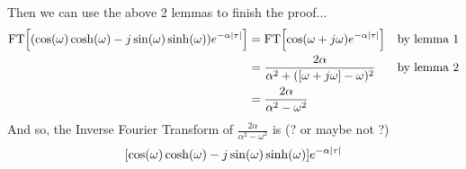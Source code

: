Then we can use the above 2 lemmas to finish the proof...
\begin{align*}
\mathrm{FT}{\left[{\left(\cos(\omega)\cosh(\omega)-j\sin(\omega)\sinh(\omega)\right)}e^{-\alpha{\left\lvert \tau \right\rvert}}\right]}
  &= \mathrm{FT}{\left[\cos(\omega+j\omega) e^{-\alpha{\left\lvert \tau \right\rvert}}\right]}
  && \text{by lemma 1}
  \\&= \frac{2\alpha}{\alpha^2+([\omega+j\omega]-\omega)^2}
  && \text{by lemma 2}
  \\&= \frac{2\alpha}{\alpha^2-\omega^2}
\end{align*}
And so, the Inverse Fourier Transform of $\frac{2\alpha}{\alpha^2-\omega^2}$ is (? or maybe not ?)
$${\left[\cos(\omega)\cosh(\omega)-j\sin(\omega)\sinh(\omega)\right]}e^{-\alpha{\left\lvert \tau \right\rvert}}$$
